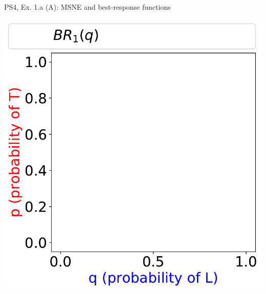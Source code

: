 \begin{frame}{PS4, Ex. 1.a (A): MSNE and best-response functions}
\begin{multicols}{2}
    \includegraphics[width=\columnwidth]{figures/empty_plot_}
  \vfill\null
  \end{multicols}
\end{frame}
